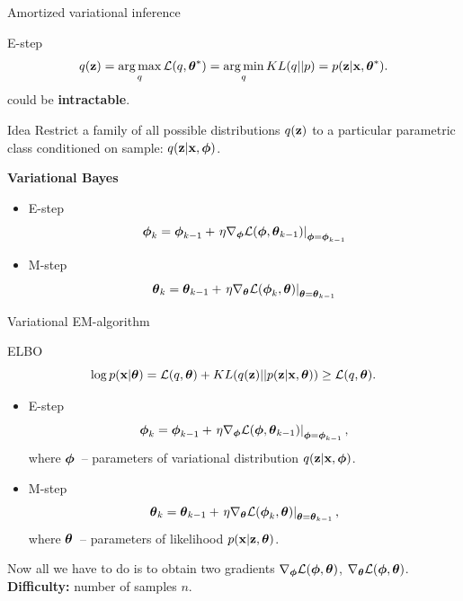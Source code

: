 \begin{frame}{Amortized variational inference}
    \begin{block}{E-step}
    \vspace{-0.3cm}
    \[
		q(\mathbf{z}) = \operatorname*{arg\,max}_q \mathcal{L} (q, \boldsymbol{\theta}^*) = \operatorname*{arg\,min}_q KL(q || p) =
		 p(\mathbf{z}| \mathbf{x}, \boldsymbol{\theta}^*).
	\]
	could be \textbf{intractable}.
    \end{block}
	\begin{block}{Idea}
	Restrict a family of all possible distributions $q(\mathbf{z})$ to a particular parametric class conditioned on sample: $q(\mathbf{z}|\mathbf{x}, \boldsymbol{\phi})$.
	\end{block}
	
	\textbf{Variational Bayes}
	\begin{itemize}
		\item E-step
		\[
		\boldsymbol{\phi}_k = \boldsymbol{\phi}_{k-1} + \left.\eta \nabla_{\boldsymbol{\phi}} \mathcal{L}(\boldsymbol{\phi}, \boldsymbol{\theta}_{k-1})\right|_{\boldsymbol{\phi}=\boldsymbol{\phi}_{k-1}}
		\]
		\item M-step
		\[
		\boldsymbol{\theta}_k = \boldsymbol{\theta}_{k-1} + \left.\eta \nabla_{\boldsymbol{\theta}} \mathcal{L}(\boldsymbol{\phi}_k, \boldsymbol{\theta})\right|_{\boldsymbol{\theta}=\boldsymbol{\theta}_{k-1}}
		\]
	\end{itemize}
\end{frame}%
\begin{frame}{Variational EM-algorithm}

	\begin{block}{ELBO}
		\vspace{-0.1cm}
		\[
		\log p(\mathbf{x}| \boldsymbol{\theta}) = \mathcal{L} (q, \boldsymbol{\theta}) + KL(q(\mathbf{z}) || p(\mathbf{z}|\mathbf{x}, \boldsymbol{\theta})) \geq \mathcal{L} (q, \boldsymbol{\theta}).
		\]
	\end{block}
	\begin{itemize}
		\item E-step
		\[
		\boldsymbol{\phi}_k = \boldsymbol{\phi}_{k-1} + \left.\eta \nabla_{\boldsymbol{\phi}} \mathcal{L}(\boldsymbol{\phi}, \boldsymbol{\theta}_{k-1})\right|_{\boldsymbol{\phi}=\boldsymbol{\phi}_{k-1}},
		\]
		where $\boldsymbol{\phi}$~-- parameters of variational distribution $q(\mathbf{z} | \mathbf{x}, \boldsymbol{\phi})$.
		\item M-step
		\[
		\boldsymbol{\theta}_k = \boldsymbol{\theta}_{k-1} + \left.\eta \nabla_{\boldsymbol{\theta}} \mathcal{L}(\boldsymbol{\phi}_k, \boldsymbol{\theta})\right|_{\boldsymbol{\theta}=\boldsymbol{\theta}_{k-1}},
		\]
		where $\boldsymbol{\theta}$~-- parameters of likelihood $p(\mathbf{x} | \mathbf{z}, \boldsymbol{\theta})$.
	\end{itemize}
	Now all we have to do is to obtain two gradients $\nabla_{\boldsymbol{\phi}} \mathcal{L}(\boldsymbol{\phi}, \boldsymbol{\theta})$, $\nabla_{\boldsymbol{\theta}} \mathcal{L}(\boldsymbol{\phi}, \boldsymbol{\theta})$.  \\
	\textbf{Difficulty:} number of samples $n$.
\end{frame}
